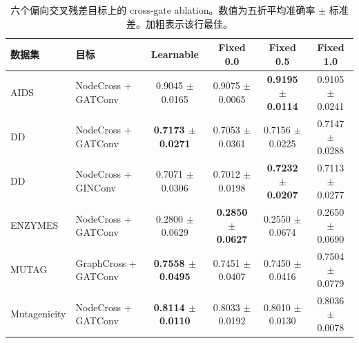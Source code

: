 \begin{table}[t]
\centering
\scriptsize
\setlength{\tabcolsep}{4pt}
\caption{六个偏向交叉残差目标上的 cross-gate ablation。数值为五折平均准确率 $\pm$ 标准差。加粗表示该行最佳。}
\label{tab:cross_gate_ablation_full}
\begin{tabular}{llcccc}
\toprule
数据集 & 目标 & Learnable & Fixed 0.0 & Fixed 0.5 & Fixed 1.0 \\
\midrule
AIDS & NodeCross + GATConv & 0.9045 $\pm$ 0.0165 & 0.9075 $\pm$ 0.0065 & \textbf{0.9195 $\pm$ 0.0114} & 0.9105 $\pm$ 0.0241 \\
DD & NodeCross + GATConv & \textbf{0.7173 $\pm$ 0.0271} & 0.7053 $\pm$ 0.0361 & 0.7156 $\pm$ 0.0225 & 0.7147 $\pm$ 0.0288 \\
DD & NodeCross + GINConv & 0.7071 $\pm$ 0.0306 & 0.7012 $\pm$ 0.0198 & \textbf{0.7232 $\pm$ 0.0207} & 0.7113 $\pm$ 0.0277 \\
ENZYMES & NodeCross + GATConv & 0.2800 $\pm$ 0.0629 & \textbf{0.2850 $\pm$ 0.0627} & 0.2550 $\pm$ 0.0674 & 0.2650 $\pm$ 0.0690 \\
MUTAG & GraphCross + GATConv & \textbf{0.7558 $\pm$ 0.0495} & 0.7451 $\pm$ 0.0407 & 0.7450 $\pm$ 0.0416 & 0.7504 $\pm$ 0.0779 \\
Mutagenicity & NodeCross + GATConv & \textbf{0.8114 $\pm$ 0.0110} & 0.8033 $\pm$ 0.0192 & 0.8010 $\pm$ 0.0130 & 0.8036 $\pm$ 0.0078 \\
\bottomrule
\end{tabular}
\end{table}
